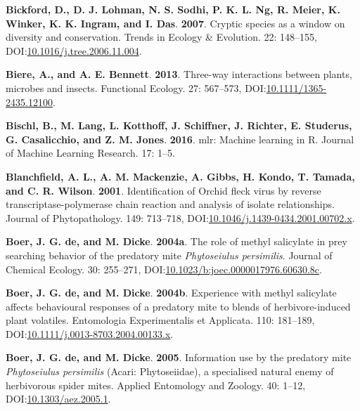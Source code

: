 \documentclass[12pt,final,CPage]{ufthesis}
\newlength{\cslhangindent}
\newenvironment{CSLReferences}[2] %
{%
	\setlength{\parindent}{0pt}
	\ifodd #1 \everypar{\setlength{\hangindent}{\cslhangindent}}\ignorespaces\fi
	\ifnum #2 > 0
	\setlength{\parskip}{#2\baselineskip}
	\fi
}%
{}
\begin{document}
{\begin{CSLReferences}{1}{0}
  \leavevmode{}%
  \textbf{Bickford, D., D. J. Lohman, N. S. Sodhi, P. K. L. Ng, R. Meier, K. Winker, K. K. Ingram, and I. Das}. \textbf{2007}. Cryptic species as a window on diversity and conservation. Trends in Ecology {\&} Evolution. 22: 148--155, DOI:\href{https://doi.org/10.1016/j.tree.2006.11.004}{10.1016/j.tree.2006.11.004}.

  \leavevmode{}%
  \textbf{Biere, A., and A. E. Bennett}. \textbf{2013}. Three-way interactions between plants, microbes and insects. Functional Ecology. 27: 567--573, DOI:\href{https://doi.org/10.1111/1365-2435.12100}{10.1111/1365-2435.12100}.

  \leavevmode{}%
  \textbf{Bischl, B., M. Lang, L. Kotthoff, J. Schiffner, J. Richter, E. Studerus, G. Casalicchio, and Z. M. Jones}. \textbf{2016}. {mlr}: Machine learning in {R}. Journal of Machine Learning Research. 17: 1--5.

  \leavevmode{}%
  \textbf{Blanchfield, A. L., A. M. Mackenzie, A. Gibbs, H. Kondo, T. Tamada, and C. R. Wilson}. \textbf{2001}. Identification of {Orchid fleck virus} by reverse transcriptase-polymerase chain reaction and analysis of isolate relationships. Journal of Phytopathology. 149: 713--718, DOI:\href{https://doi.org/10.1046/j.1439-0434.2001.00702.x}{10.1046/j.1439-0434.2001.00702.x}.

  \leavevmode{}%
  \textbf{Boer, J. G. de, and M. Dicke}. \textbf{2004a}. The role of methyl salicylate in prey searching behavior of the predatory mite {\emph{Phytoseiulus persimilis}}. Journal of Chemical Ecology. 30: 255--271, DOI:\href{https://doi.org/10.1023/b:joec.0000017976.60630.8c}{10.1023/b:joec.0000017976.60630.8c}.

  \leavevmode{}%
  \textbf{Boer, J. G. de, and M. Dicke}. \textbf{2004b}. Experience with methyl salicylate affects behavioural responses of a predatory mite to blends of herbivore-induced plant volatiles. Entomologia Experimentalis et Applicata. 110: 181--189, DOI:\href{https://doi.org/10.1111/j.0013-8703.2004.00133.x}{10.1111/j.0013-8703.2004.00133.x}.

  \leavevmode{}%
  \textbf{Boer, J. G. de, and M. Dicke}. \textbf{2005}. Information use by the predatory mite {\emph{Phytoseiulus persimilis}} {({Acari}: {Phytoseiidae})}, a specialised natural enemy of herbivorous spider mites. Applied Entomology and Zoology. 40: 1--12, DOI:\href{https://doi.org/10.1303/aez.2005.1}{10.1303/aez.2005.1}.


\end{CSLReferences}}
\end{document}
